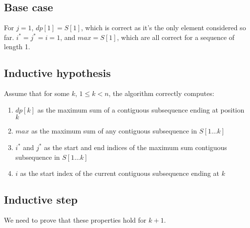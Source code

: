 \documentclass{article}
\begin{document}
\subsection{Base case}
For $j = 1$, $dp[1] = S[1]$, which is correct as it's the only element considered so far.
$i^* = j^* = i = 1$, and $max = S[1]$, which are all correct for a sequence of length 1.

\subsection{Inductive hypothesis}
Assume that for some $k$, $1 \leq k < n$, the algorithm correctly computes:
\begin{enumerate}
    \item $dp[k]$ as the maximum sum of a contiguous subsequence ending at position $k$
    \item $max$ as the maximum sum of any contiguous subsequence in $S[1\ldots k]$
    \item $i^*$ and $j^*$ as the start and end indices of the maximum sum contiguous subsequence in $S[1\ldots k]$
    \item $i$ as the start index of the current contiguous subsequence ending at $k$
\end{enumerate}

\subsection{Inductive step}
We need to prove that these properties hold for $k+1$.
\end{document}
